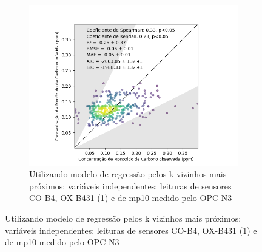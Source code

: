 \begin{figure}[h]
\begin{subfigure}{0.495\textwidth}
        \includegraphics[width=\textwidth]{chapters/4-CALIBRAÇÃO MÚLTIPLOS SENSORES/Figuras/CO-co-o31-pm10-knn-Regression.png}
        \caption{Utilizando modelo de regressão pelos k vizinhos mais próximos; variáveis independentes: leituras de sensores CO-B4, OX-B431 (1) e de \acrshort{mp10} medido pelo OPC-N3}
        \label{fig:data-co-o31-mp10-reference-corr-KNN}
    \end{subfigure}
\end{figure}